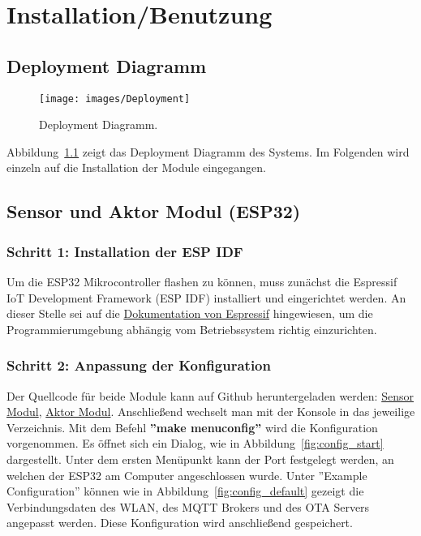 \chapter{Installation/Benutzung}
\label{cha:Installation/Benutzung}

\section{Deployment Diagramm}

\begin{figure}[hbt]
	\centering
	\texttt{[image: images/Deployment]}
	\caption[Deployment Diagramm]{Deployment Diagramm.}
	\label{fig:deployment_diagramm}
\end{figure}

Abbildung~\ref{fig:deployment_diagramm} zeigt das Deployment Diagramm des Systems. Im Folgenden wird einzeln auf die Installation der Module eingegangen.

\section{Sensor und Aktor Modul (ESP32)}
\label{cha:Installation_IDF}
\subsection{Schritt 1: Installation der ESP IDF}
Um die ESP32 Mikrocontroller flashen zu können, muss zunächst die Espressif IoT Development Framework (ESP IDF) installiert und eingerichtet werden. An dieser Stelle sei auf die \href{https://docs.espressif.com/projects/esp-idf/en/latest/index.html}{Dokumentation von Espressif} hingewiesen, um die Programmierumgebung abhängig vom Betriebssystem richtig einzurichten.

\subsection{Schritt 2: Anpassung der Konfiguration}
Der Quellcode für beide Module kann auf Github heruntergeladen werden: \href{https://github.com/maxbachmann-university/esp32-sensor-modul}{Sensor Modul}, \href{https://github.com/maxbachmann-university/esp32-actuator-module}{Aktor Modul}.
Anschließend wechselt man mit der Konsole in das jeweilige Verzeichnis. Mit dem Befehl \textbf{''make menuconfig''} wird die Konfiguration vorgenommen. Es öffnet sich ein Dialog, wie in Abbildung~\ref{fig:config_start} dargestellt. Unter dem ersten Menüpunkt kann der Port festgelegt werden, an welchen der ESP32 am Computer angeschlossen wurde. Unter ''Example Configuration'' können wie in Abbildung~\ref{fig:config_default} gezeigt die Verbindungsdaten des WLAN, des MQTT Brokers und des OTA Servers angepasst werden. Diese Konfiguration wird anschließend gespeichert.

